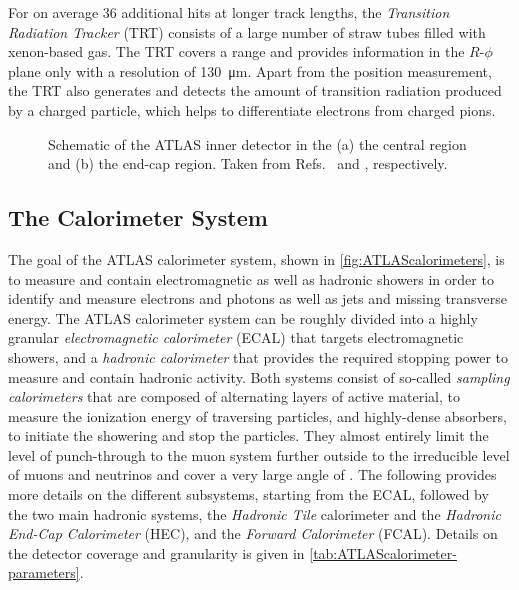 For on average 36 additional hits at longer track lengths, the \emph{Transition Radiation Tracker} (TRT) consists of a large number of straw tubes filled with xenon-based gas. The TRT covers a range  and provides information in the $R$-$\phi$ plane only with a resolution of \SI{130}{\micro\meter}.
Apart from the position measurement, the TRT also generates and detects the amount of transition radiation produced by a charged particle, which helps to differentiate electrons from charged pions.

\begin{figure}
    \caption{Schematic of the ATLAS inner detector in the (a) the central region and (b) the end-cap region. Taken from Refs.~\cite{ATL-PHYS-PUB-2015-009} and \cite{PERF-2007-01}, respectively.}
    \label{fig:ATLASinnerdetector}
\end{figure}


\subsection{The Calorimeter System}



The goal of the ATLAS calorimeter system, shown in \cref{fig:ATLAScalorimeters}, is to measure and contain electromagnetic as well as hadronic showers in order to identify and measure electrons and photons as well as jets and missing transverse energy. The ATLAS calorimeter system can be roughly divided into a highly granular \emph{electromagnetic calorimeter} (ECAL) that targets electromagnetic showers, and a \emph{hadronic calorimeter} that provides the required stopping power to measure and contain hadronic activity. Both systems consist of so-called \emph{sampling calorimeters} that are composed of alternating layers of active material, to measure the ionization energy of traversing particles, and highly-dense absorbers, to initiate the showering and stop the particles. They almost entirely limit the level of punch-through to the muon system further outside to the irreducible level of muons and neutrinos and cover a very large angle of . The following provides more details on the different subsystems, starting from the ECAL, followed by the two main hadronic systems, the \emph{Hadronic Tile} calorimeter and the \emph{Hadronic End-Cap Calorimeter} (HEC), and the \emph{Forward Calorimeter} (FCAL). Details on the detector coverage and granularity is given in \cref{tab:ATLAScalorimeter-parameters}. 

